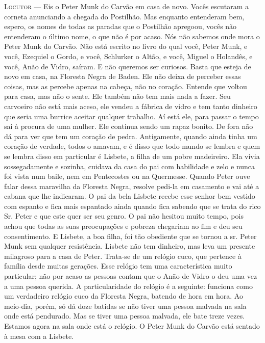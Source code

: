 \textsc{Locutor} --- Eis o Peter Munk do Carvão em casa de novo. Vocês escutaram a
corneta anunciando a chegada do Postilhão. Mas enquanto entenderam bem,
espero, os nomes de todas as paradas que o Postilhão apregoou, vocês não
entenderam o último nome, o que não é por acaso. Nós não sabemos onde
mora o Peter Munk do Carvão. Não está escrito no livro do qual você,
Peter Munk, e você, Ezequiel o Gordo, e você, Schlurker o Altão, e você,
Miguel o Holandês, e você, Anão de Vidro, saíram. E não queremos ser
curiosos. Basta que esteja de novo em casa, na Floresta Negra de Baden.
Ele não deixa de perceber essas coisas, mas as percebe apenas na cabeça,
não no coração. Entende que voltou para casa, mas não o sente. Ele
também não tem mais nada a fazer. Seu carvoeiro não está mais aceso, ele
vendeu a fábrica de vidro e tem tanto dinheiro que seria uma burrice
aceitar qualquer trabalho. Aí está ele, para passar o tempo sai à
procura de uma mulher. Ele continua sendo um rapaz bonito. De fora não
dá para ver que tem um coração de pedra. Antigamente, quando ainda tinha
um coração de verdade, todos o amavam, e é disso que todo mundo se
lembra e quem se lembra disso em particular é Lisbete, a filha de um
pobre madeireiro. Ela vivia sossegadamente e sozinha, cuidava da casa do
pai com habilidade e zelo e nunca foi vista num baile, nem em
Pentecostes ou na Quermesse. Quando Peter ouve falar dessa maravilha da
Floresta Negra, resolve pedi-la em casamento e vai até a cabana que lhe
indicaram. O pai da bela Lisbete recebe esse senhor bem vestido com
espanto e fica mais espantado ainda quando fica sabendo que se trata do
rico Sr. Peter e que este quer ser seu genro. O pai não hesitou muito
tempo, pois achou que todas as suas preocupações e pobreza chegariam ao
fim e deu seu consentimento. E Lisbete, a boa filha, foi tão obediente
que se tornou a sr. Peter Munk sem qualquer resistência. Lisbete não
tem dinheiro, mas leva um presente milagroso para a casa de Peter.
Trata-se de um relógio cuco, que pertence à família desde muitas
gerações. Esse relógio tem uma característica muito particular; não por
acaso as pessoas contam que o Anão de Vidro o deu uma vez a uma pessoa
querida. A particularidade do relógio é a seguinte: funciona como um
verdadeiro relógio cuco da Floresta Negra, batendo de hora em hora. Ao
meio-dia, porém, só dá doze batidas se não tiver uma pessoa malvada na
sala onde está pendurado. Mas se tiver uma pessoa malvada, ele bate
treze vezes. Estamos agora na sala onde está o relógio. O Peter Munk do
Carvão está sentado à mesa com a Lisbete.

